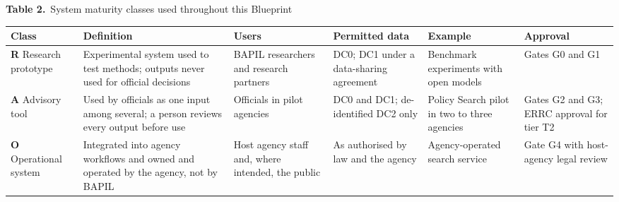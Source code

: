 \documentclass[border=10pt]{standalone}
\begin{document}
\begin{minipage}{22cm}
{\large\bfseries Table 2.}\ {\large System maturity classes used throughout this Blueprint}\par\vspace{7pt}
\small
{}
\begin{tabularx}{\linewidth}{@{}>{\hsize=0.709\hsize\raggedright\arraybackslash}X>{\hsize=1.418\hsize\raggedright\arraybackslash}X>{\hsize=0.927\hsize\raggedright\arraybackslash}X>{\hsize=0.927\hsize\raggedright\arraybackslash}X>{\hsize=1.036\hsize\raggedright\arraybackslash}X>{\hsize=0.982\hsize\raggedright\arraybackslash}X@{}}
\arrayrulecolor{bapilrule}\toprule
\rowcolor{white}\textbf{Class} & \textbf{Definition} & \textbf{Users} & \textbf{Permitted data} & \textbf{Example} & \textbf{Approval} \\
\midrule
\textbf{R} Research prototype & Experimental system used to test methods; outputs never used for official decisions & BAPIL researchers and research partners & DC0; DC1 under a data-sharing agreement & Benchmark experiments with open models & Gates G0 and G1 \\
\textbf{A} Advisory tool & Used by officials as one input among several; a person reviews every output before use & Officials in pilot agencies & DC0 and DC1; de-identified DC2 only & Policy Search pilot in two to three agencies & Gates G2 and G3; ERRC approval for tier T2 \\
\textbf{O} Operational system & Integrated into agency workflows and owned and operated by the agency, not by BAPIL & Host agency staff and, where intended, the public & As authorised by law and the agency & Agency-operated search service & Gate G4 with host-agency legal review \\
\bottomrule
\end{tabularx}
\par{}
\end{minipage}
\end{document}
